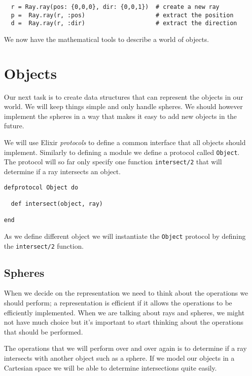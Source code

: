 \documentclass[a4paper,11pt]{article}
\begin{document}
\begin{verbatim}
  r = Ray.ray(pos: {0,0,0}, dir: {0,0,1})  # create a new ray
  p =  Ray.ray(r, :pos)                    # extract the position
  d =  Ray.ray(r, :dir)                    # extract the direction
\end{verbatim}

We now have the mathematical tools to describe a world of objects.



\section{Objects}

Our next task is to create data structures that can
represent the objects in our world. We will keep things simple and
only handle spheres. We should however implement the spheres in a way
that makes it easy to add new objects in the future.

We will use Elixir {\em protocols} to define a common interface that
all objects should implement. Similarly to defining a module we define
a protocol called {\tt Object}. The protocol will so far only specify
one function {\tt intersect/2} that will determine if a ray
intersects an object.

\begin{verbatim}
defprotocol Object do

  def intersect(object, ray)
  
end
\end{verbatim}

As we define different object we will instantiate the {\tt Object}
protocol by defining the {\tt intersect/2} function. 

\subsection*{Spheres}

When we decide on the representation we need to think about the
operations we should perform; a representation is efficient if it
allows the operations to be efficiently implemented. When we are
talking about rays and spheres, we might not have much choice but it's
important to start thinking about the operations that should be
performed.

The operations that we will perform over and over again is to
determine if a ray intersects with another object such as a sphere. If
we model our objects in a Cartesian space we will be able to
determine intersections quite easily.
\end{document}
